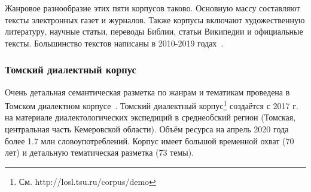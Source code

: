 Жанровое разнообразие этих пяти корпусов таково. Основную массу составляют тексты электронных газет и журналов. Также корпусы включают художественную литературу, научные статьи, переводы Библии, статьи Википедии и официальные тексты. Большинство текстов написаны в 2010-2019 годах~\cite[59]{Arkhangelskiy2020}.

\subsubsection{Томский диалектный корпус}
Очень детальная семантическая разметка по жанрам и тематикам проведена в Томском диалектном корпусе~\cite{Zemicheva2019}.
Томский  диалектный  корпус\footnote{ См. http://losl.tsu.ru/corpus/demo}  создаётся  с  2017  г.  на  материале  диалектологических  экспедиций  в  среднеобский  регион  (Томская,  центральная  часть  Кемеровской  области).  Объём  ресурса на  апрель 2020 года более 1.7 млн словоупотреблений. Корпус имеет большой временной охват (70 лет) и детальную тематическая разметка (73  темы). 
